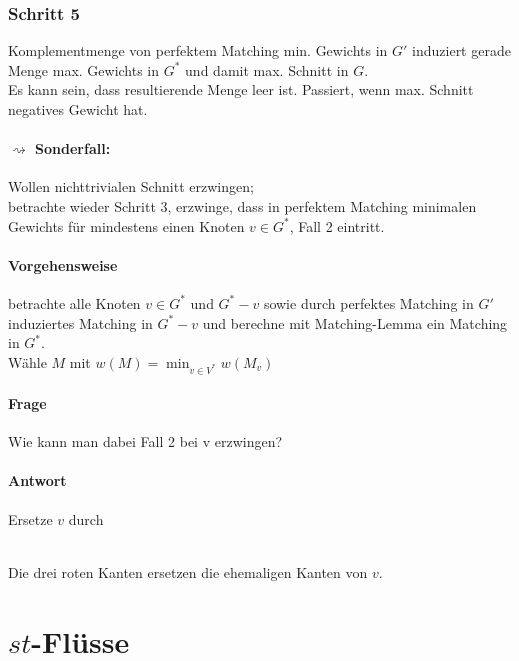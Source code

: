\documentclass{article}
\begin{document}
\subsubsection{Schritt 5}
Komplementmenge von perfektem Matching min. Gewichts in $G'$ induziert gerade Menge max. Gewichts in $G^*$ und damit max. Schnitt in $G$.\\
Es kann sein, dass resultierende Menge leer ist. Passiert, wenn max. Schnitt negatives Gewicht hat.
\paragraph{$\rightsquigarrow$ Sonderfall:} Wollen nichttrivialen Schnitt erzwingen;\\
betrachte wieder Schritt 3, erzwinge, dass in perfektem Matching minimalen Gewichts für mindestens einen Knoten $v \in G^*$, Fall 2 eintritt.
\paragraph{Vorgehensweise} betrachte alle Knoten $v \in G^*$ und $G^* - v$ sowie durch perfektes Matching in $G'$ induziertes Matching in $G^* - v$ und berechne mit Matching-Lemma ein Matching in $G^*$.\\
Wähle $M$ mit $w(M) = \min_{v\in V^*}w(M_v)$

\paragraph{Frage}
Wie kann man dabei Fall 2 bei v erzwingen?
\paragraph{Antwort} Ersetze $v$ durch
\begin{center}
\\
Die drei roten Kanten ersetzen die ehemaligen Kanten von $v$.
\end{center}

\section{$st$-Flüsse}
\end{document}
